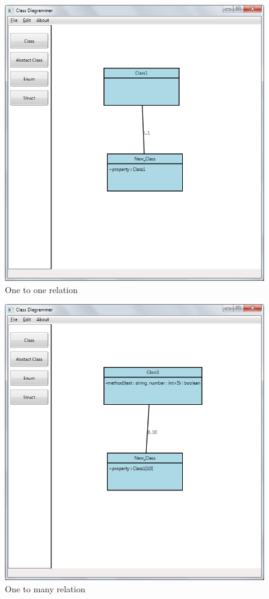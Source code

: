 \begin{figure}[htbp]
   \centering
   \includegraphics[width=1\linewidth]{figure/one_one_relation}
   \caption{One to one relation}
   \label{fig:one_one}
\end{figure}

\begin{figure}[htbp]
   \centering
   \includegraphics[width=1\linewidth]{figure/one_many_relation}
   \caption{One to many relation}
   \label{fig:one_many}
\end{figure}



